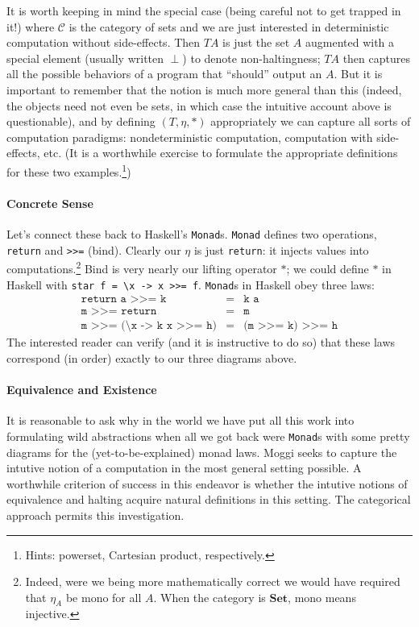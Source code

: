 \documentclass{article}
\renewcommand{\[}{\begin{eqnarray*}}
\renewcommand{\]}{\end{eqnarray*}}
\theoremstyle{definition}
\begin{document}
It is worth keeping in mind the special case (being careful not to get trapped
in it!) where $\mathcal C$ is the category of sets and we are just interested in
deterministic computation without side-effects. Then $TA$ is just 
the set $A$ augmented with a special element (usually written $\perp$) to
denote non-haltingness; $TA$ then captures all the possible behaviors of a
program that ``should'' output an $A$. But it is important to remember that the
notion is much more general than this (indeed, the objects need not even be
sets, in which case the intuitive account above is questionable), and by
defining $(T,\eta,*)$ appropriately we can capture all sorts of computation
paradigms: nondeterministic computation, computation with side-effects, etc. (It
is a worthwhile exercise to formulate the appropriate definitions for these two
examples.\footnote{Hints: powerset, Cartesian product, respectively.})

\paragraph{Concrete Sense} Let's connect these back to Haskell's
\texttt{Monad}s. \texttt{Monad} defines two operations, \texttt{return}
and \texttt{>>=} (bind). Clearly our $\eta$ is just
\texttt{return}: it injects values into computations.\footnote{Indeed, were we
being more mathematically correct we would have required that $\eta_A$ be mono
for all $A$. When the category is $\mathbf{Set}$, mono means injective.} Bind is
very nearly our lifting operator $*$; we could define $*$ in Haskell with
\texttt{star f = \textbackslash x -> x >>= f}. \texttt{Monad}s in Haskell obey
three laws:
\begin{eqnarray}
\texttt{return a >>= k}  & \texttt{=} & \texttt{k a}\\
  \texttt{m >>= return}  & \texttt {=} & \texttt{m}\\
\texttt{m >>= (\textbackslash x -> k x >>= h)} & \texttt{=} & \texttt{(m >>= k) >>= h}
\end{eqnarray}
The interested reader can verify (and it is instructive to do so) that these
laws correspond (in order) exactly to our three diagrams above.

\paragraph{Equivalence and Existence} It is reasonable to ask why in the world
we have put all this work into formulating wild abstractions when all we got
back were \texttt{Monad}s with some pretty diagrams for the
(yet-to-be-explained) monad laws. Moggi seeks to capture the intutive notion of a
computation in the most general setting possible. A worthwhile criterion of
success in this endeavor is whether the intutive notions of equivalence and
halting acquire natural definitions in this setting. The categorical approach
permits this investigation.
\end{document}
